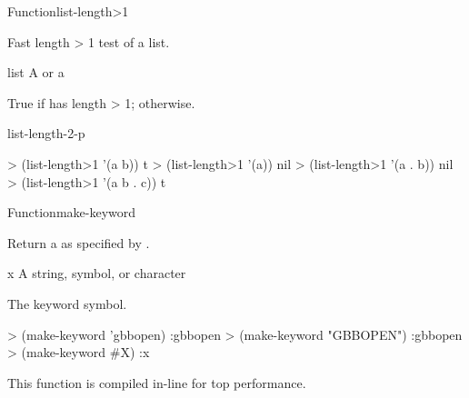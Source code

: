 \documentclass[10pt,twoside,english,pdftex]{article}
\newcommand{\inline}{This function is compiled in-line for top performance.}
\begin{document}

\begin{functiondoc}{Function}{list-length>1}%
  { \returns{} }
%
%

\fnsyntax

\fnpurpose Fast length > 1 test of a list.

\fnpackage {}

\fnmodule {}

\fnargs
\begin{args}{list}
\arg[list] A  or a 
\end{args}

\fnreturns True if  has length > 1; \nil{} otherwise.

\begin{alsos}{list-length-2-p}
\end{alsos}

\fnexamples
\begin{example}
> (list-length>1 '(a b))
t
> (list-length>1 '(a))
nil
> (list-length>1 '(a . b))
nil
> (list-length>1 '(a b . c))
t
\end{example}

\end{functiondoc}


\begin{functiondoc}{Function}{make-keyword}{ \returns{}
    } 
%
%
  
\fnsyntax

\fnpurpose Return a  as specified by .

\fnpackage {}

\fnmodule {}

\fnargs
\begin{args}{x}
\arg[x] A string, symbol, or character
\end{args}

\fnreturns The keyword symbol.

\fnexamples
\begin{example}
> (make-keyword 'gbbopen)
:gbbopen
> (make-keyword "GBBOPEN")
:gbbopen
> (make-keyword #\bkslash{}X)
:x
\end{example}

\fnnote \inline

\end{functiondoc}
\end{document}
